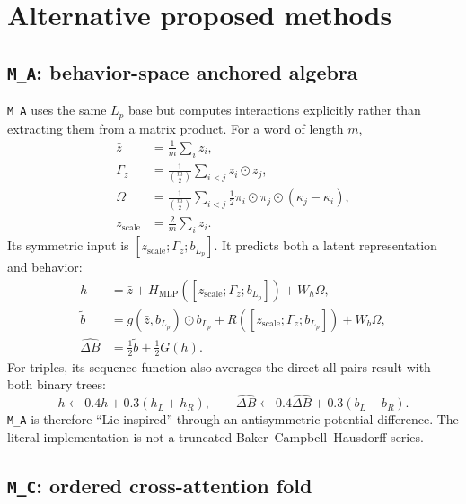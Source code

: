 \documentclass[11pt,a4paper]{article}
\newcommand{\od}{\odot}
\newcommand{\dBh}{\widehat{\Delta B}}
\newcommand{\MA}{\texttt{M\_A}}
\newcommand{\MC}{\texttt{M\_C}}
\begin{document}
\section{Alternative proposed methods}

\subsection{\MA: behavior-space anchored algebra}

\MA{} uses the same $L_p$ base but computes interactions explicitly rather
than extracting them from a matrix product.  For a word of length $m$,
\begin{align}
\bar z&=\frac1m\sum_i z_i,\\
\Gamma_z&=\frac1{\binom m2}\sum_{i<j}z_i\od z_j,\\
\Omega&=\frac1{\binom m2}\sum_{i<j}
\frac12\pi_i\od\pi_j\od(\kappa_j-\kappa_i),\\
z_{\mathrm{scale}}&=\frac2m\sum_i z_i.
\end{align}
Its symmetric input is $[z_{\mathrm{scale}};\Gamma_z;b_{L_p}]$.  It predicts
both a latent representation and behavior:
\begin{align}
h&=\bar z+H_{\mathrm{MLP}}([z_{\mathrm{scale}};\Gamma_z;b_{L_p}])
+W_h\Omega,\\
\widetilde b&=g(\bar z,b_{L_p})\od b_{L_p}
+R([z_{\mathrm{scale}};\Gamma_z;b_{L_p}])+W_b\Omega,\\
\dBh&=\tfrac12\widetilde b+\tfrac12G(h).
\end{align}
For triples, its sequence function also averages the direct all-pairs result
with both binary trees:
\[
h\leftarrow0.4h+0.3(h_L+h_R),
\qquad
\dBh\leftarrow0.4\dBh+0.3(b_L+b_R).
\]
\MA{} is therefore ``Lie-inspired'' through an antisymmetric potential
difference.  The literal implementation is not a truncated
Baker--Campbell--Hausdorff series.

\subsection{\MC: ordered cross-attention fold}
\end{document}
